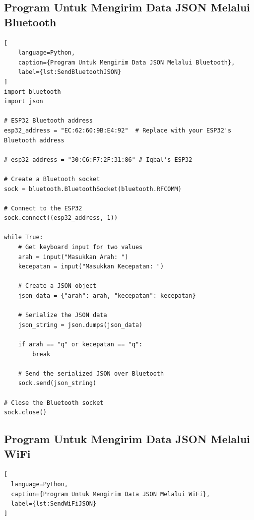 \subsection{Program Untuk Mengirim Data JSON Melalui Bluetooth}

\begin{lstlisting}[
    language=Python,
    caption={Program Untuk Mengirim Data JSON Melalui Bluetooth},
    label={lst:SendBluetoothJSON}
]
import bluetooth
import json

# ESP32 Bluetooth address
esp32_address = "EC:62:60:9B:E4:92"  # Replace with your ESP32's Bluetooth address

# esp32_address = "30:C6:F7:2F:31:86" # Iqbal's ESP32

# Create a Bluetooth socket
sock = bluetooth.BluetoothSocket(bluetooth.RFCOMM)

# Connect to the ESP32
sock.connect((esp32_address, 1))

while True:
    # Get keyboard input for two values
    arah = input("Masukkan Arah: ")
    kecepatan = input("Masukkan Kecepatan: ")
    
    # Create a JSON object
    json_data = {"arah": arah, "kecepatan": kecepatan}

    # Serialize the JSON data
    json_string = json.dumps(json_data)
    
    if arah == "q" or kecepatan == "q":
        break

    # Send the serialized JSON over Bluetooth
    sock.send(json_string)

# Close the Bluetooth socket
sock.close()

\end{lstlisting}

\subsection{Program Untuk Mengirim Data JSON Melalui WiFi}

\begin{lstlisting}[
  language=Python,
  caption={Program Untuk Mengirim Data JSON Melalui WiFi},
  label={lst:SendWiFiJSON}
]

\end{lstlisting}

